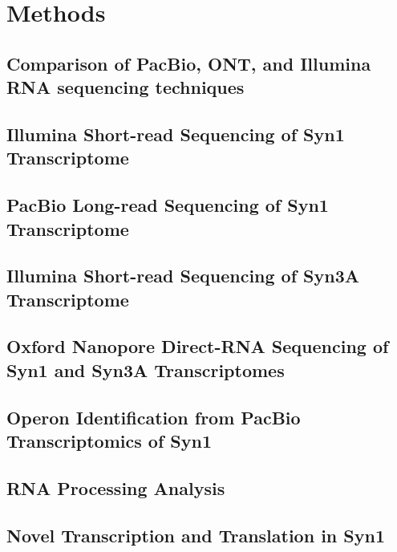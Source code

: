 \section{Methods}

\subsection{Comparison of PacBio, ONT, and Illumina RNA sequencing techniques} \label{method:rnaseq}


\subsection{Illumina Short-read Sequencing of Syn1 Transcriptome}


\subsection{PacBio Long-read Sequencing of Syn1 Transcriptome}


\subsection{Illumina Short-read Sequencing of Syn3A Transcriptome}


\subsection{Oxford Nanopore Direct-RNA Sequencing of Syn1 and Syn3A Transcriptomes}


\subsection{Operon Identification from PacBio Transcriptomics of Syn1}


\subsection{RNA Processing Analysis}


\subsection{Novel Transcription and Translation in Syn1}


